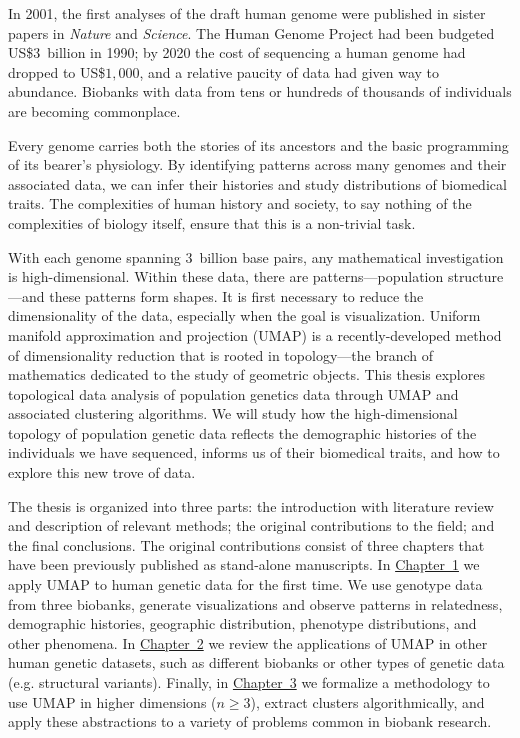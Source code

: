 %

In 2001, the first analyses of the draft human genome were published in sister papers in \textit{Nature} and \textit{Science}. The Human Genome Project had been budgeted US\$$3$~billion in 1990; by 2020 the cost of sequencing a human genome had dropped to US\$$1,000$, and a relative paucity of data had given way to abundance\citep{gibbs_human_2020}. Biobanks with data from tens or hundreds of thousands of individuals are becoming commonplace.

Every genome carries both the stories of its ancestors and the basic programming of its bearer's physiology. By identifying patterns across many genomes and their associated data, we can infer their histories and study distributions of biomedical traits. The complexities of human history and society, to say nothing of the complexities of biology itself, ensure that this is a non-trivial task.

With each genome spanning $3$~billion base pairs, any mathematical investigation is high-dimensional. Within these data, there are patterns---population structure---and these patterns form shapes. It is first necessary to reduce the dimensionality of the data, especially when the goal is visualization. Uniform manifold approximation and projection (UMAP) is a recently-developed method of dimensionality reduction that is rooted in topology---the branch of mathematics dedicated to the study of geometric objects. This thesis explores topological data analysis of population genetics data through UMAP and associated clustering algorithms. We will study how the high-dimensional topology of population genetic data reflects the demographic histories of the individuals we have sequenced, informs us of their biomedical traits, and how to explore this new trove of data.

The thesis is organized into three parts: the introduction with literature review and description of relevant methods; the original contributions to the field; and the final conclusions. The original contributions consist of three chapters that have been previously published as stand-alone manuscripts. In \hyperref[chap:chapter1]{Chapter~1} we apply UMAP to human genetic data for the first time. We use genotype data from three biobanks, generate visualizations and observe patterns in relatedness, demographic histories, geographic distribution, phenotype distributions, and other phenomena. In \hyperref[chap:chapter2]{Chapter~2} we review the applications of UMAP in other human genetic datasets, such as different biobanks or other types of genetic data (e.g. structural variants). Finally, in \hyperref[chap:chapter3]{Chapter~3} we formalize a methodology to use UMAP in higher dimensions ($n \ge 3$), extract clusters algorithmically, and apply these abstractions to a variety of problems common in biobank research.

